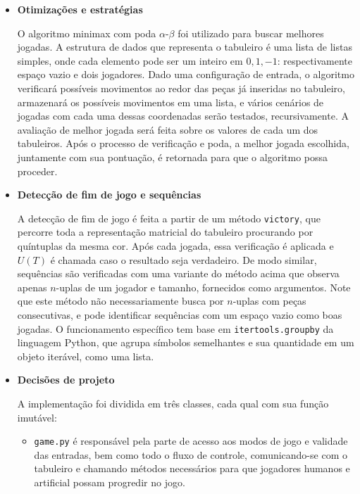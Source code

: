 \documentclass{../../sftex/sftex}
\begin{document}
\begin{itemize}
    \item \textbf{Otimizações e estratégias}

        O algoritmo minimax com poda $\alpha$-$\beta$ foi utilizado para
        buscar melhores jogadas. A estrutura de dados que representa o
        tabuleiro é uma lista de listas simples, onde cada elemento pode
        ser um inteiro em $0, 1, -1$: respectivamente espaço vazio e dois
        jogadores. Dado uma configuração de entrada, o algoritmo verificará
        possíveis movimentos ao redor das peças já inseridas no tabuleiro,
        armazenará os possíveis movimentos em uma lista, e vários cenários
        de jogadas com cada uma dessas coordenadas serão testados,
        recursivamente. A avaliação de melhor jogada será feita sobre os
        valores de cada um dos tabuleiros. Após o processo de verificação
        e poda, a melhor jogada escolhida, juntamente com sua pontuação,
        é retornada para que o algoritmo possa proceder.

    \item \textbf{Detecção de fim de jogo e sequências}

        A detecção de fim de jogo é feita a partir de um método
        \texttt{victory}, que percorre toda a representação matricial do
        tabuleiro procurando por quíntuplas da mesma cor. Após cada jogada,
        essa verificação é aplicada e $U(T)$ é chamada caso o resultado
        seja verdadeiro. De modo similar, sequências são verificadas com
        uma variante do método acima que observa apenas $n$-uplas de um
        jogador e tamanho, fornecidos como argumentos. Note que este método
        não necessariamente busca por $n$-uplas com peças consecutivas, e
        pode identificar sequências com um espaço vazio como boas jogadas. O
        funcionamento específico tem base em \texttt{itertools.groupby} da
        linguagem Python, que agrupa símbolos semelhantes e sua quantidade em
        um objeto iterável, como uma lista.

    \item \textbf{Decisões de projeto}

        A implementação foi dividida em três classes, cada qual com sua
        função imutável:

        \begin{itemize}

            \item \texttt{game.py} é responsável pela parte de acesso aos
                modos de jogo e validade das entradas, bem como todo o fluxo
                de controle, comunicando-se com o tabuleiro e chamando métodos
                necessários para que jogadores humanos e artificial possam
                progredir no jogo.


\end{itemize}
\end{itemize}
\end{document}
